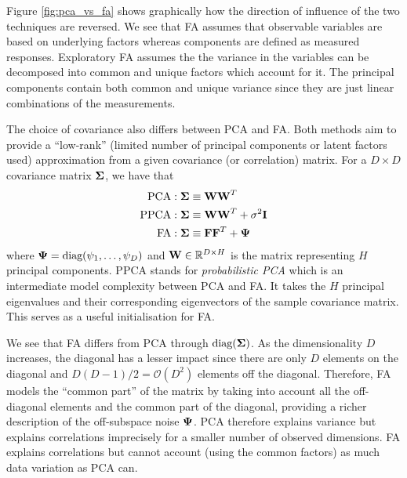 \documentclass[12pt, letterpaper]{article}
\begin{document}
    Figure \ref{fig:pca_vs_fa} shows graphically how the direction of influence of the two techniques are reversed. We see that FA assumes that observable variables are based on underlying factors whereas components are defined as measured responses. 
    Exploratory FA assumes the the variance in the variables can be decomposed into common and unique factors which account for it. The principal components contain both common and unique variance since they are just linear combinations of the measurements.

    The choice of covariance also differs between PCA and FA. Both methods aim to provide a ``low-rank'' (limited number of principal components or latent factors used) approximation from a given covariance (or correlation) matrix. For a $D\times D$ covariance matrix $\vb{\Sigma}$, we have that 
    \begin{align*}
        \text{PCA} &: \vb{\Sigma}\equiv \vb{WW}^T \\
        \text{PPCA} &: \vb{\Sigma}\equiv \vb{WW}^T + \sigma^2\vb{I} \\
        \text{FA} &: \vb{\Sigma}\equiv \vb{FF}^T+\vb{\Psi}
    \end{align*}
    where $\vb{\Psi}=\text{diag}(\psi_1,\dots,\psi_D)$ and $\vb{W}\in\mathbb{R}^{D\times H}$ is the matrix representing $H$ principal components. PPCA stands for \emph{probabilistic PCA} which is an intermediate model complexity between PCA and FA. It takes the $H$ principal eigenvalues and their corresponding eigenvectors of the sample covariance matrix. This serves as a useful initialisation for FA.
    
    We see that FA differs from PCA through $\text{diag}(\vb{\Sigma})$. As the dimensionality $D$ increases, the diagonal has a lesser impact since there are only $D$ elements on the diagonal and $D(D-1)/2 = \mathcal{O}(D^2)$ elements off the diagonal. Therefore, FA models the ``common part'' of the matrix by taking into account all the off-diagonal elements and the common part of the diagonal, providing a richer description of the off-subspace noise $\vb{\Psi}$. PCA therefore explains variance but explains correlations imprecisely for a smaller number of observed dimensions. FA explains correlations but cannot account (using the common factors) as much data variation as PCA can.
    
\end{document}
